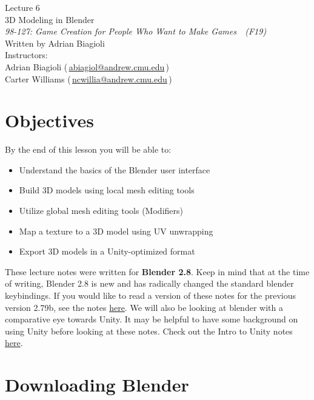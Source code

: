 \documentclass[11pt]{article}
\makeatletter
\newcommand{\lecturenum}{6}
\newcommand{\lecturename}{3D Modeling in Blender}
\newcommand{\authorname}{Adrian Biagioli}
\newcommand{\coursenum}{98-127}
\newcommand{\coursename}{Game Creation for People Who Want to Make Games}
\newcommand{\coursesem}{F19}
\newcommand{\instructors}{Adrian Biagioli (\,\href{mailto:abiagiol@andrew.cmu.edu}{abiagiol@andrew.cmu.edu}\,) \\ Carter Williams (\,\href{mailto:ncwillia@andrew.cmu.edu}{ncwillia@andrew.cmu.edu}\,)}
\makeatother
\begin{document}
\thispagestyle{plain}
{
    \vspace{1.5em}
    \begin{center}
    {
        \huge
        Lecture \lecturenum \\
        \vspace{0.5em}
        \lecturename
        \vspace{0.4em}
    } \\
    {
        \it
        \coursenum: \coursename\ \ (\coursesem)
    } \\
    \vspace{1.0em}
    Written by \authorname \\
    \vspace{0.7em}
    Instructors:\\ \instructors
    \end{center}
}

\section{Objectives}

By the end of this lesson you will be able to:
\begin{itemize}
    \item Understand the basics of the Blender user interface
    \item Build 3D models using local mesh editing tools
    \item Utilize global mesh editing tools (Modifiers)
    \item Map a texture to a 3D model using UV unwrapping
    \item Export 3D models in a Unity-optimized format
\end{itemize}

\noindent These lecture notes were written for {\bf Blender 2.8}.  Keep in mind that at the time 
of writing, Blender 2.8 is new and has radically changed the standard blender keybindings. If you
would like to read a version of these notes for the previous version 2.79b, see the notes
\href{http://stage.gamecreation.org/StuCo/lectures/lec06_blender279.pdf}{here}.  We will also
be looking at blender with a comparative eye towards Unity.  It may be helpful to have
some background on using Unity before looking at these notes.  Check out the Intro to Unity notes
\href{http://stage.gamecreation.org/StuCo/lectures/lec02.pdf}{here}.

\section{Downloading Blender}
\end{document}
